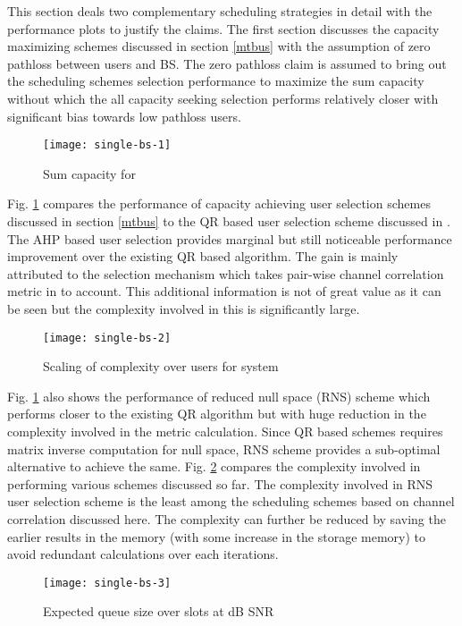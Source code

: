 
This section deals two complementary scheduling strategies in detail with the performance plots to justify the claims. The first section discusses the capacity maximizing schemes discussed in section \ref{mtbus} with the assumption of zero pathloss between users and BS. The zero pathloss claim is assumed to bring out the scheduling schemes selection performance to maximize the sum capacity without which the all capacity seeking selection performs relatively closer with significant bias towards low pathloss users.
\begin{figure}
\centering
\texttt{[image: single-bs-1]}
\caption[short]{Sum capacity for }
\label{single-bs-f1}
\end{figure}

Fig. \ref{single-bs-f1} compares the performance of capacity achieving user selection schemes discussed in section \ref{mtbus} to the QR based user selection scheme discussed in \cite{antti_user_selection,jin2010novel}. The AHP based user selection provides marginal but still noticeable performance improvement over the existing QR based algorithm. The gain is mainly attributed to the selection mechanism which takes pair-wise channel correlation metric in to account. This additional information is not of great value as it can be seen but the complexity involved in this is significantly large.
\begin{figure}
\centering
\texttt{[image: single-bs-2]}
\caption[short]{Scaling of complexity over users for  system}
\label{single-bs-f2}
\end{figure}

Fig. \ref{single-bs-f1} also shows the performance of reduced null space (RNS) scheme which performs closer to the existing QR algorithm but with huge reduction in the complexity involved in the metric calculation. Since QR based schemes requires matrix inverse computation for null space, RNS scheme provides a sub-optimal alternative to achieve the same. Fig. \ref{single-bs-f2} compares the complexity involved in performing various schemes discussed so far. The complexity involved in RNS user selection scheme is the least among the scheduling schemes based on channel correlation discussed here. The complexity can further be reduced by saving the earlier results in the memory (with some increase in the storage memory) to avoid redundant calculations over each iterations.
\begin{figure}
\centering
\texttt{[image: single-bs-3]}
\caption[short]{Expected queue size  over  slots at dB SNR}
\label{single-bs-f3}
\end{figure}

